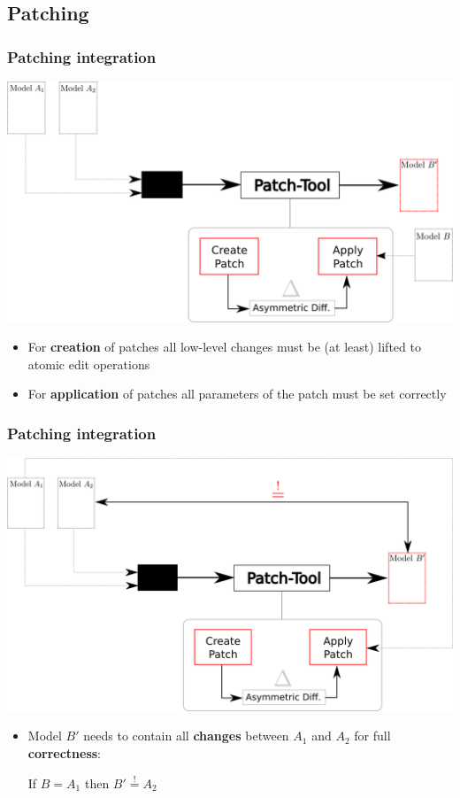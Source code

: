 \documentclass[10pt]{beamer}
\begin{document}
\subsection{Patching}
\begin{frame}
\frametitle{Patching integration}
\begin{center}
\includegraphics[scale=0.4]{patching}\\
\end{center}
\begin{itemize}
  \item For \textbf{creation} of patches all low-level changes must be (at
  least) lifted to atomic edit operations
  \item For \textbf{application} of patches all parameters of the patch must be
  set correctly
\end{itemize}
\end{frame}
\begin{frame}
\frametitle{Patching integration}
\begin{center}
\includegraphics[scale=0.4]{patching_correctness}\\
\end{center}
\begin{itemize}
  \item Model $B'$ needs to contain all \textbf{changes}
  between $A_1$ and $A_2$ for full \textbf{correctness}: \\
  \begin{center}
  If $B = A_1$ then $B' \overset{!}{=} A_2$ 
  \end{center}
\end{itemize}
\end{frame}
\end{document}
